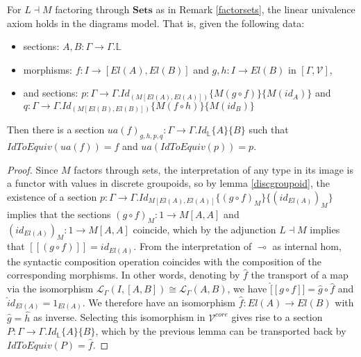 \documentclass[a4paper,english]{lipics-v2018}
\begin{document}
  \begin{theorem}
    For $L \dashv M$ factoring through $\mathbf{Sets}$ as in Remark \ref{factorsets}, the linear univalence axiom holds in the diagrams model. That is, given the following data:
    \begin{itemize}
    \item sections: $A, B : \Gamma \to \Gamma.{\mathbb{L}}$
    \item morphisms: $f : I \to [El(A), El(B)]$ and $g, h : I \to El(B)$ in $[\Gamma, \mathcal{V}]$,
    \item and sections: $p : \Gamma \to \Gamma.Id_{(M[El(A),El(A)])}\{M(g \circ f)\}\{M(id_A)\}$ and $q : \Gamma \to \Gamma.Id_{(M[El(B),El(B)])}\{M(f \circ h)\}\{M(id_B)\}$
    \end{itemize}
    Then there is a section $ua(f)_{g, h, p, q} : \Gamma \to \Gamma.Id_{\mathbb{L}}\{A\}\{B\}$ such that $IdToEquiv(ua(f)) = f$ and $ua(IdToEquiv(p)) = p$.
    \begin{proof}
      Since $M$ factors through sets, the interpretation of any type in its image is a functor with values in discrete groupoids, so by lemma \ref{discgroupoid}, the existence of a section $p : \Gamma \to \Gamma.Id_{M[El(A), El(A)]}\{(g \circ f)_M\}\{(id_{El(A)})_M\}$ implies that the sections $(g \circ f)_M : 1 \to M[A, A]$ and $(id_{El(A)})_M : 1 \to M[A,A]$ coincide, which by the adjunction $L \dashv M$ implies that $[[(g \circ f)]] = id_{El(A)}$. From the interpretation of $\multimap$ as internal hom, the syntactic composition operation coincides with the composition of the corresponding morphisms. In other words, denoting by $\hat f$ the transport of a map via the isomorphism $\mathcal{L}_\Gamma(I, [A,B]) \cong \mathcal{L}_\Gamma(A,B)$, we have $\hat [[g \circ f]] = \hat g \circ \hat f$ and $\hat id_{El(A)} = 1_{El(A)}$. We therefore have an isomorphism $\hat f : El(A) \to El(B)$ with $\hat g = \hat h$ as inverse. Selecting this isomorphism in $\mathcal{V}^{core}$ gives rise to a section $P : \Gamma \to \Gamma.Id_{\mathbb{L}}\{A\}\{B\}$, which by the previous lemma can be transported back by $IdToEquiv(P) = \hat f$.
\end{proof}
\end{theorem}
\end{document}
